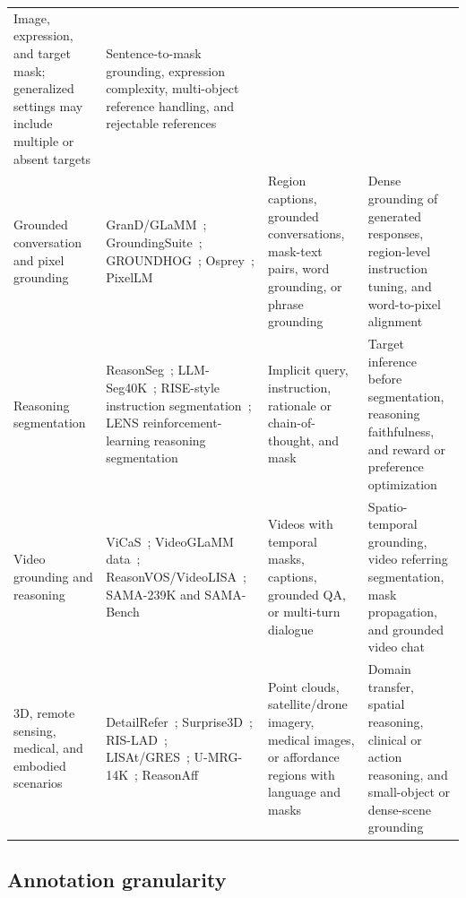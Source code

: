 \begin{table}[t]
\begin{tabularx}{\textwidth}{>{\raggedright\arraybackslash}p{}>{\raggedright\arraybackslash}X>{\raggedright\arraybackslash}p{}>{\raggedright\arraybackslash}p{}}
Image, expression, and target mask; generalized settings may include multiple or absent targets &
Sentence-to-mask grounding, expression complexity, multi-object reference handling, and rejectable references \\
Grounded conversation and pixel grounding &
GranD/GLaMM~\citep{rasheedGlammPixelGrounding2024};
GroundingSuite~\citep{huGroundingSuiteMeasuringComplex2025};
GROUNDHOG~\citep{zhangGroundhogGroundingLarge2024};
Osprey~\citep{yuanOspreyPixelUnderstanding2024};
PixelLM~\citep{xuPixelalignedLanguageModel2024} &
Region captions, grounded conversations, mask-text pairs, word grounding, or phrase grounding &
Dense grounding of generated responses, region-level instruction tuning, and word-to-pixel alignment \\
Reasoning segmentation &
ReasonSeg~\citep{xlaiLisaReasoningSegmentation2024};
LLM-Seg40K~\citep{jwangLlmsegBridgingImage2024};
RISE-style instruction segmentation~\citep{zhouReasoningImplicitSelfsupervised2026};
LENS reinforcement-learning reasoning segmentation~\citep{zhuLensLearningSegment2026} &
Implicit query, instruction, rationale or chain-of-thought, and mask &
Target inference before segmentation, reasoning faithfulness, and reward or preference optimization \\
Video grounding and reasoning &
ViCaS~\citep{atharVicasDatasetCombining2025};
VideoGLaMM data~\citep{munasingheVideoglammLargeMultimodal2025};
ReasonVOS/VideoLISA~\citep{baiOneTokenSeg2024};
SAMA-239K and SAMA-Bench~\citep{sunSamaMultiturnReferential2026} &
Videos with temporal masks, captions, grounded QA, or multi-turn dialogue &
Spatio-temporal grounding, video referring segmentation, mask propagation, and grounded video chat \\
3D, remote sensing, medical, and embodied scenarios &
DetailRefer~\citep{chen3DDRESDetailed3D2026};
Surprise3D~\citep{huangSurprise3dDatasetSpatial2026};
RIS-LAD~\citep{yeRISLADBenchmarkModel2026};
LISAt/GRES~\citep{quenumLisatLanguageinstructedSegmentation2026};
U-MRG-14K~\citep{yanMedreasonerReinforcementLearning2026};
ReasonAff~\citep{wangAffordancer1ReinforcementLearning2026} &
Point clouds, satellite/drone imagery, medical images, or affordance regions with language and masks &
Domain transfer, spatial reasoning, clinical or action reasoning, and small-object or dense-scene grounding \\
\bottomrule
\end{tabularx}
\end{table}

\subsection{Annotation granularity}

